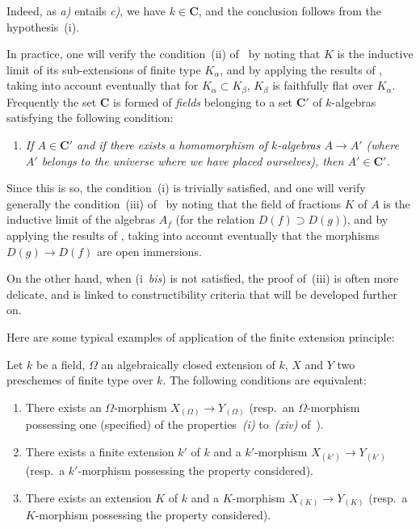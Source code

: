 Indeed, as \emph{a)} entails \emph{c)}, we have $k\in\boldsymbol{C}$, and the conclusion follows from the hypothesis~(i).

\begin{remark}[9.1.3]
\label{IV.9.1.3}
In practice, one will verify the condition~(ii) of~ by noting that $K$ is the inductive limit of its sub-extensions of finite type $K_\alpha$, and by applying the results of , taking into account eventually that for $K_\alpha\subset K_\beta$, $K_\beta$ is faithfully flat over $K_\alpha$.
Frequently the set $\boldsymbol{C}$ is formed of \emph{fields} belonging to a set $\boldsymbol{C}'$ of $k$-algebras satisfying the following condition:
\begin{enumerate}[label=(\roman*~\emph{bis})]
  \item \itshape If $A\in\boldsymbol{C}'$ and if there exists a homomorphism of $k$-algebras $A\to A'$ (where $A'$ belongs to the universe where we have placed ourselves), then $A'\in\boldsymbol{C}'$.
\end{enumerate}
\end{remark}

Since this is so, the condition~(i) is trivially satisfied, and one will verify generally the condition~(iii) of~ by noting that the field of fractions $K$ of $A$ is the inductive limit of the algebras $A_f$ (for the relation $D(f)\supset D(g)$), and by applying the results of , taking into account eventually that the morphisms $D(g)\to D(f)$ are open immersions.

On the other hand, when (i~\emph{bis}) is not satisfied, the proof of~(iii) is often more delicate, and is linked to constructibility criteria that will be developed further on.

Here are some typical examples of application of the finite extension principle:

\begin{proposition}[9.1.4]
\label{IV.9.1.4}
Let $k$ be a field, $\Omega$ an algebraically closed extension of $k$, $X$ and $Y$ two preschemes of finite type over $k$.
The following conditions are equivalent:
\begin{enumerate}[label=\emph{\alph*)}]
  \item There exists an $\Omega$-morphism $X_{(\Omega)}\to Y_{(\Omega)}$ \textnormal{(resp.}\ an $\Omega$-morphism possessing one (specified) of the properties~\emph{(i)} to~\emph{(xiv)} of~\textnormal{)}.
  \item There exists a finite extension $k'$ of $k$ and a $k'$-morphism $X_{(k')}\to Y_{(k')}$ \textnormal{(resp.}\ a $k'$-morphism possessing the property considered\textnormal{)}.
  \item There exists an extension $K$ of $k$ and a $K$-morphism $X_{(K)}\to Y_{(K)}$ \textnormal{(resp.}\ a $K$-morphism possessing the property considered\textnormal{)}.
\end{enumerate}
\end{proposition}

